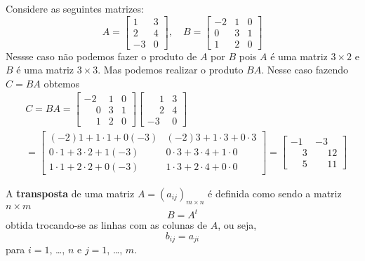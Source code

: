 \documentclass{beamer}
\begin{document}
  \begin{frame}
    \begin{exemplo}
      Considere as seguintes matrizes: 
      \[
        A = \begin{bmatrix}
          1 & 3\\
          2 & 4\\
          -3 & 0
        \end{bmatrix},\quad
        B = \begin{bmatrix}
          -2 & 1 & 0\\
          0 & 3 & 1\\
          1 & 2 & 0
        \end{bmatrix}
      \]
      Nessse caso não podemos fazer o produto de $A$ por $B$ pois $A$ é uma matriz $3 \times 2$ e $B$ é uma matriz $3 \times 3$. 
      Mas podemos realizar o produto $BA$. Nesse caso fazendo $C = BA$ obtemos
      \begin{eqnarray*}
        &C = BA = \begin{bmatrix}
          -2 & 1 & 0\\
          \phantom{-}0 & 3 & 1\\
          \phantom{-}1 & 2 & 0
        \end{bmatrix}\begin{bmatrix}
          \phantom{-}1 & 3\\
          \phantom{-}2 & 4\\
          -3 & 0
        \end{bmatrix} \\
        &= \begin{bmatrix}
          (-2)1 + 1\cdot 1 + 0(-3) & (-2)3 + 1\cdot 3 + 0\cdot 3\\
          0\cdot 1 + 3\cdot 2 + 1(-3) & 0\cdot 3 + 3\cdot 4 + 1\cdot 0\\
          1 \cdot 1 + 2 \cdot 2 + 0(-3) & 1 \cdot 3 + 2 \cdot 4 + 0\cdot 0
        \end{bmatrix}
        = \begin{bmatrix}
          -1 & -3\\
          \phantom{-}3 & \phantom{-}12\\
          \phantom{-}5 & \phantom{-}11
        \end{bmatrix}
      \end{eqnarray*}
    \end{exemplo}
  \end{frame}

  \begin{frame}
    \begin{definicao}
      A \textbf{transposta} de uma matriz $A = (a_{ij})_{m \times n}$ é definida como sendo a matriz $n \times m$ 
      \[
        B = A^t 
      \]
      obtida trocando-se as linhas com as colunas de $A$, ou seja, 
      \[
        b_{ij} = a_{ji}
      \]
      para $i = 1$, \dots, $n$ e $j = 1$, \dots, $m$.
    \end{definicao}
  \end{frame}
\end{document}
